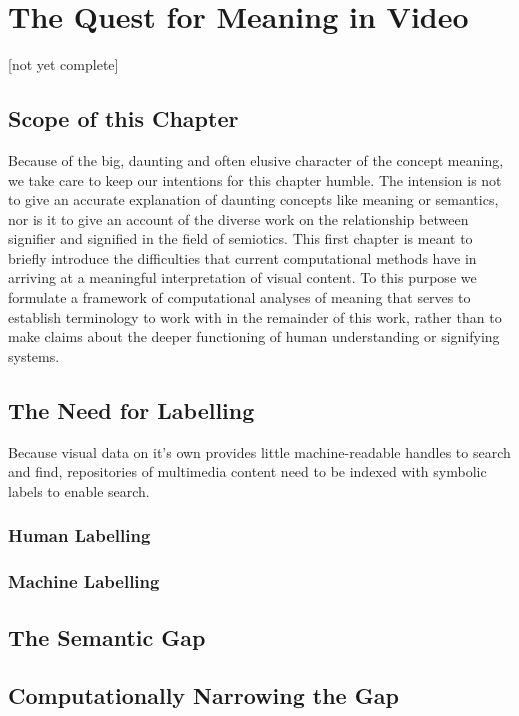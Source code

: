 \chapter{The Quest for Meaning in Video}
\label{ch:quest}

[not yet complete]

\section{Scope of this Chapter}

Because of the big, daunting and often elusive character of the concept meaning, we take care to keep our intentions for this chapter humble. The intension is not to give an accurate explanation of daunting concepts like meaning or semantics, nor is it to give an account of the diverse work on the relationship between signifier and signified in the field of semiotics. This first chapter is meant to briefly introduce the difficulties that current computational methods have in arriving at a meaningful interpretation of visual content. To this purpose we formulate a framework of computational analyses of meaning that serves to establish terminology to work with in the remainder of this work, rather than to make claims about the deeper functioning of human understanding or signifying systems.

\section{The Need for Labelling}

Because visual data on it's own provides little machine-readable handles to search and find, repositories of multimedia content need to be indexed with symbolic labels to enable search.


\subsection{Human Labelling}

\subsection{Machine Labelling}


\section{The Semantic Gap}


\section{Computationally Narrowing the Gap}

